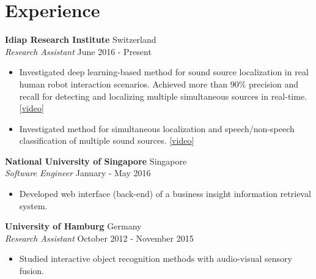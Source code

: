\documentclass[a4paper,11pt]{article} %
\begin{document}

\section{Experience}

\textbf{Idiap Research Institute}  \hfill Switzerland \\
\textit{Research Assistant} \hfill June 2016 - Present
\vspace{-.9\parskip}
\begin{itemize}
  \item Investigated deep learning-based method for sound source localization in real human robot interaction scenarios. Achieved more than 90\% precision and recall for detecting and localizing multiple simultaneous sources in real-time.
    [\href{https://www.youtube.com/watch?v=_4EwuVlE_pU}{video}]
  \item Investigated method for simultaneous localization and speech/non-speech classification of multiple sound sources.
    [\href{https://www.youtube.com/watch?v=O7bQvg03RTc}{video}]
\end{itemize}


\textbf{National University of Singapore}  \hfill Singapore \\
\textit{Software Engineer} \hfill January - May 2016
\vspace{-.9\parskip}
\begin{itemize}
  \item Developed web interface (back-end) of a business insight information retrieval system.
\end{itemize}


\textbf{University of Hamburg} \hfill Germany \\
\textit{Research Assistant}  \hfill October 2012 - November 2015
\vspace{-.9\parskip}
\begin{itemize}
  \item Studied interactive object recognition methods with audio-visual sensory fusion.
\end{itemize}

\end{document}
